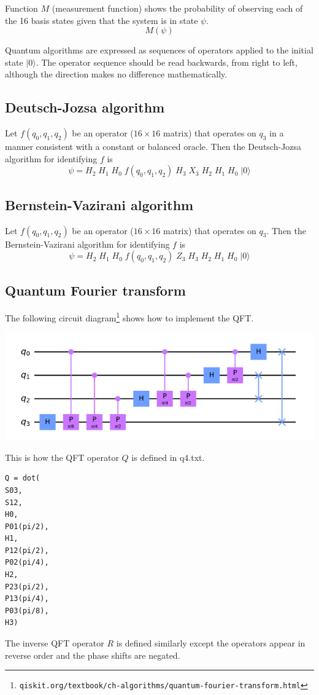 \documentclass[12pt]{article}
\begin{document}
\bigskip
\noindent
Function $M$ (measurement function) shows the probability of observing
each of the 16 basis states given that the system is in state $\psi$.
\begin{equation*}
M(\psi)
\end{equation*}

\noindent
Quantum algorithms are expressed as sequences of operators applied
to the initial state $|0\rangle$.
The operator sequence should be read backwards, from right to left,
although the direction makes no difference mathematically.

\subsection*{Deutsch-Jozsa algorithm}
Let $f(q_0,q_1,q_2)$ be an operator ($16\times16$ matrix) that operates on $q_3$
in a manner consistent with a constant or balanced oracle.
Then the Deutsch-Jozsa algorithm for identifying $f$ is
\begin{equation*}
\psi = H_2 \; H_1 \; H_0 \; f(q_0,q_1,q_2) \; H_3 \; X_3 \; H_2 \; H_1 \; H_0 \; |0\rangle
\end{equation*}

\subsection*{Bernstein-Vazirani algorithm}
Let $f(q_0,q_1,q_2)$ be an operator ($16\times16$ matrix) that operates on $q_3$.
Then the Bernstein-Vazirani algorithm for identifying $f$ is
\begin{equation*}
\psi = H_2 \; H_1 \; H_0 \; f(q_0,q_1,q_2) \; Z_3 \; H_3 \; H_2 \; H_1 \; H_0 \; |0\rangle
\end{equation*}

\subsection*{Quantum Fourier transform}
The following circuit diagram\footnote{\tt qiskit.org/textbook/ch-algorithms/quantum-fourier-transform.html}
shows how to implement the QFT.

\begin{center}
\includegraphics[scale=0.5]{qft.png}
\end{center}

\noindent
This is how the QFT operator $Q$ is defined in q4.txt.

\begin{Verbatim}
Q = dot(
S03,
S12,
H0,
P01(pi/2),
H1,
P12(pi/2),
P02(pi/4),
H2,
P23(pi/2),
P13(pi/4),
P03(pi/8),
H3)
\end{Verbatim}

\noindent
The inverse QFT operator $R$ is defined similarly except the operators appear in reverse order
and the phase shifts are negated.
\end{document}
